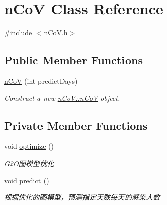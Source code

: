 \hypertarget{classnCoV}{}\section{n\+CoV Class Reference}
\label{classnCoV}


{\ttfamily \#include $<$n\+Co\+V.\+h$>$}

\subsection*{Public Member Functions}
\begin{DoxyCompactItemize}
\item 
\hyperlink{classnCoV_a30d4a90c5f401cf6943e104ec737dc48}{n\+CoV} (int predict\+Days)
\begin{DoxyCompactList}\small\item\em Construct a new \hyperlink{classnCoV_a30d4a90c5f401cf6943e104ec737dc48}{n\+Co\+V\+::n\+CoV} object. \end{DoxyCompactList}\end{DoxyCompactItemize}
\subsection*{Private Member Functions}
\begin{DoxyCompactItemize}
\item 
void \hyperlink{classnCoV_acf5ddd73cab8522622b2602258507c08}{optimize} ()
\begin{DoxyCompactList}\small\item\em G2\+O图模型优化 \end{DoxyCompactList}\item 
void \hyperlink{classnCoV_a5a0b30d27da271601d45c144c6a3da2d}{predict} ()
\begin{DoxyCompactList}\small\item\em 根据优化的图模型，预测指定天数每天的感染人数 \end{DoxyCompactList}\end{DoxyCompactItemize}
